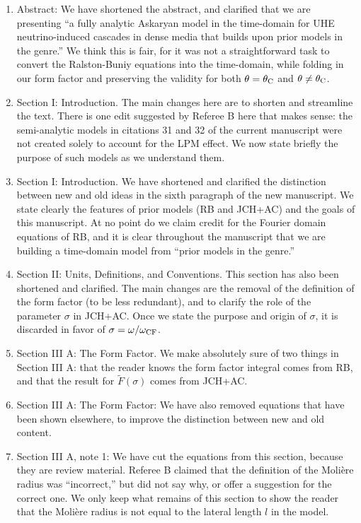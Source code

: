 \documentclass[12pt]{article}
\begin{document}
\begin{enumerate}
\item Abstract: We have shortened the abstract, and clarified that we are presenting ``a fully analytic Askaryan model in the time-domain for UHE neutrino-induced cascades in dense media that builds upon prior models in the genre.'' We think this is fair, for it was not a straightforward task to convert the Ralston-Buniy equations into the time-domain, while folding in our form factor and preserving the validity for both $\theta = \theta_{\rm C}$ and $\theta \neq \theta_{\rm C}$.
\item Section I: Introduction.  The main changes here are to shorten and streamline the text.  There is one edit suggested by Referee B here that makes sense: the semi-analytic models in citations 31 and 32 of the current manuscript were not created solely to account for the LPM effect.  We now state briefly the purpose of such models as we understand them.
\item Section I: Introduction. We have shortened and clarified the distinction between new and old ideas in the sixth paragraph of the new manuscript.  We state clearly the features of prior models (RB and JCH+AC) and the goals of this manuscript.  At no point do we claim credit for the Fourier domain equations of RB, and it is clear throughout the manuscript that we are building a time-domain model from ``prior models in the genre.''
\item Section II: Units, Definitions, and Conventions.  This section has also been shortened and clarified.  The main changes are the removal of the definition of the form factor (to be less redundant), and to clarify the role of the parameter $\sigma$ in JCH+AC.  Once we state the purpose and origin of $\sigma$, it is discarded in favor of $\sigma = \omega/\omega_{\rm CF}$.
\item Section III A: The Form Factor.  We make absolutely sure of two things in Section III A: that the reader knows the form factor integral comes from RB, and that the result for $\widetilde{F}(\sigma)$ comes from JCH+AC.
\item Section III A: The Form Factor: We have also removed equations that have been shown elsewhere, to improve the distinction between new and old content.
\item Section III A, note 1: We have cut the equations from this section, because they are review material.  Referee B claimed that the definition of the Moli\`{e}re radius was ``incorrect,'' but did not say why, or offer a suggestion for the correct one.  We only keep what remains of this section to show the reader that the Moli\`{e}re radius is not equal to the lateral length $l$ in the model.

\end{enumerate}
\end{document}
